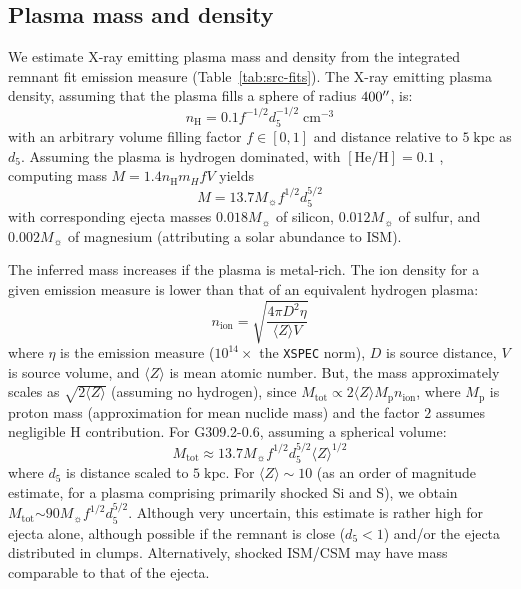 \documentclass[preprint2,tighten,trackchanges]{aastex6}
\newcommand*{\mt}{\mathrm}
\newcommand*{\unit}[1]{\;\mt{#1}}  %
\newcommand*{\abt}{\mathord{\sim}} %
\begin{document}
\subsection{Plasma mass and density}

We estimate X-ray emitting plasma mass and density from the integrated remnant
fit emission measure (Table~\ref{tab:src-fits}).
The X-ray emitting plasma density, assuming that the plasma fills a sphere of
radius $400\mbox{$^{\prime\prime}$}$, is:
\begin{equation} \label{eq:density}
    n_{\mt{H}} = 0.1 f^{-1/2} d_{5}^{-1/2} \unit{cm^{-3}}
\end{equation}
with an arbitrary volume filling factor $f \in [0,1]$ and distance relative to
$5 \unit{kpc}$ as $d_{5}$.
Assuming the plasma is hydrogen dominated, with $[\mt{He}/\mt{H}] = 0.1$
\citep{wilms2000}, computing mass $M = 1.4 n_{\mt{H}} m_{H} f V$ yields
\[
    M = 13.7 M_{\sun} f^{1/2} d_{5}^{5/2}
\]
with corresponding ejecta masses $0.018 M_{\sun}$ of silicon, $0.012 M_{\sun}$
of sulfur, and $0.002 M_{\sun}$ of magnesium (attributing a solar abundance to
ISM).

The inferred mass increases if the plasma is metal-rich.
The ion density for a given emission measure is lower than that of an
equivalent hydrogen plasma:
\[
    n_{\mt{ion}} = \sqrt{\frac{4 \pi D^2 \eta}{\langle Z \rangle V}}
\]
where $\eta$ is the emission measure ($10^{14}\times$ the \texttt{XSPEC} norm),
$D$ is source distance, $V$ is source volume, and $\langle Z \rangle$ is mean
atomic number.
But, the mass approximately scales as $\sqrt{2 \langle Z \rangle}$ (assuming no
hydrogen), since
$M_{\mt{tot}} \propto 2 \langle Z \rangle M_{\mt{p}} n_{\mt{ion}}$,
where $M_{\mt{p}}$ is proton mass (approximation for mean nuclide mass) and the
factor $2$ assumes negligible H contribution.
For G309.2-0.6, assuming a spherical volume:
\[
    M_{\mt{tot}} \approx 13.7 M_{\sun} f^{1/2} d_5^{5/2} \langle Z \rangle^{1/2}
\]
where $d_5$ is distance scaled to $5 \unit{kpc}$.
For $\langle Z \rangle \sim 10$ (as an order of magnitude estimate, for a
plasma comprising primarily shocked Si and S), we obtain
$M_{\mt{tot}} \abt 90 M_{\sun} f^{1/2} d_5^{5/2}$.
Although very uncertain, this estimate is rather high for ejecta alone,
although possible if the remnant is close ($d_5 < 1$) and/or the ejecta
distributed in clumps.
Alternatively, shocked ISM/CSM may have mass comparable to that of the ejecta.
\end{document}
